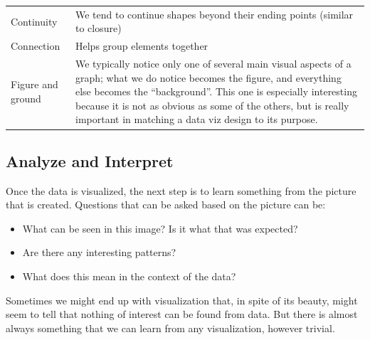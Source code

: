 \documentclass[]{book}
\providecommand{\tightlist}{%
  \setlength{\itemsep}{0pt}\setlength{\parskip}{0pt}}
\theoremstyle{definition}
\theoremstyle{definition}
\theoremstyle{definition}
\theoremstyle{remark}
\begin{document}
\begin{longtable}[]{@{}ll@{}}
\begin{minipage}[t]{0.18\columnwidth}\raggedright\strut
Continuity\strut
\end{minipage} & \begin{minipage}[t]{0.68\columnwidth}\raggedright\strut
We tend to continue shapes beyond their ending points (similar to
closure)\strut
\end{minipage}\tabularnewline
\begin{minipage}[t]{0.18\columnwidth}\raggedright\strut
Connection\strut
\end{minipage} & \begin{minipage}[t]{0.68\columnwidth}\raggedright\strut
Helps group elements together\strut
\end{minipage}\tabularnewline
\begin{minipage}[t]{0.18\columnwidth}\raggedright\strut
Figure and ground\strut
\end{minipage} & \begin{minipage}[t]{0.68\columnwidth}\raggedright\strut
We typically notice only one of several main visual aspects of a graph;
what we do notice becomes the figure, and everything else becomes the
``background''. This one is especially interesting because it is not as
obvious as some of the others, but is really important in matching a
data viz design to its purpose. \citep{principles-fusioncharts}\strut
\end{minipage}\tabularnewline
\bottomrule
\end{longtable}

\subsection{Analyze and Interpret}\label{analyze-and-interpret}

Once the data is visualized, the next step is to learn something from
the picture that is created. Questions that can be asked based on the
picture can be:

\begin{itemize}
\tightlist
\item
  What can be seen in this image? Is it what that was expected?
\item
  Are there any interesting patterns?
\item
  What does this mean in the context of the data?
\end{itemize}

Sometimes we might end up with visualization that, in spite of its
beauty, might seem to tell that nothing of interest can be found from
data. But there is almost always something that we can learn from any
visualization, however trivial.
\end{document}
